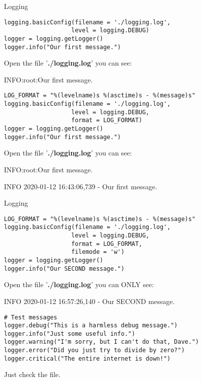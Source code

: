 \documentclass{beamer}
\begin{document}
\begin{frame}[fragile]{Logging}
\begin{verbatim}
logging.basicConfig(filename = './logging.log',
                   level = logging.DEBUG)
logger = logging.getLogger()
logger.info("Our first message.")
\end{verbatim}
\small{
Open the file '\textbf{./logging.log}' you can see:\par
\hspace{1cm}INFO:root:Our first message.}
\begin{verbatim}
LOG_FORMAT = "%(levelname)s %(asctime)s - %(message)s"
logging.basicConfig(filename = './logging.log',
                   level = logging.DEBUG,
                   format = LOG_FORMAT)
logger = logging.getLogger()
logger.info("Our first message.")
\end{verbatim}
\small{
Open the file '\textbf{./logging.log}' you can see:\par
\hspace{1cm}INFO:root:Our first message.\par
\hspace{1cm}INFO 2020-01-12 16:43:06,739 - Our first message.}
\end{frame}

\begin{frame}[fragile]{Logging}
\begin{verbatim}
LOG_FORMAT = "%(levelname)s %(asctime)s - %(message)s"
logging.basicConfig(filename = './logging.log',
                   level = logging.DEBUG,
                   format = LOG_FORMAT,
                   filemode = 'w')
logger = logging.getLogger()
logger.info("Our SECOND message.")
\end{verbatim}
\small{
Open the file '\textbf{./logging.log}' you can ONLY see:\par
\hspace{1cm}INFO 2020-01-12 16:57:26,140 - Our SECOND message.}
\begin{verbatim}
# Test messages
logger.debug("This is a harmless debug message.")
logger.info("Just some useful info.")
logger.warning("I'm sorry, but I can't do that, Dave.")
logger.error("Did you just try to divide by zero?")
logger.critical("The entire internet is down!")
\end{verbatim}
Just check the file.
\end{frame}
\end{document}
